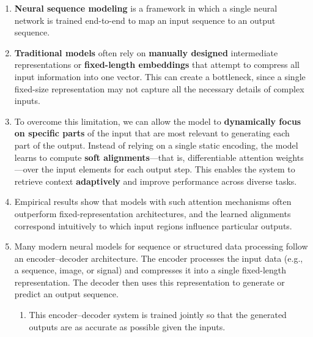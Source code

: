 \begin{enumerate}
    \item \textbf{Neural sequence modeling} is a framework in which a single neural network is trained end-to-end to map an input sequence to an output sequence. 
    \hfill \cite{arxiv/1409.0473/NMT-Jointly-Learning-Align-Translate, common/online/chatgpt}

    \item \textbf{Traditional models} often rely on \textbf{manually designed} intermediate representations or \textbf{fixed-length embeddings} that attempt to compress all input information into one vector. 
    This can create a bottleneck, since a single fixed-size representation may not capture all the necessary details of complex inputs. 
    \hfill \cite{arxiv/1409.0473/NMT-Jointly-Learning-Align-Translate, common/online/chatgpt}

    \item To overcome this limitation, we can allow the model to \textbf{dynamically focus on specific parts} of the input that are most relevant to generating each part of the output. 
    Instead of relying on a single static encoding, the model learns to compute \textbf{soft alignments}—that is, differentiable attention weights—over the input elements for each output step. 
    This enables the system to retrieve context \textbf{adaptively} and improve performance across diverse tasks.
    \hfill \cite{arxiv/1409.0473/NMT-Jointly-Learning-Align-Translate, common/online/chatgpt}

    \item Empirical results show that models with such attention mechanisms often outperform fixed-representation architectures, and the learned alignments correspond intuitively to which input regions influence particular outputs.
    \hfill \cite{arxiv/1409.0473/NMT-Jointly-Learning-Align-Translate, common/online/chatgpt}

    \item Many modern neural models for sequence or structured data processing follow an encoder–decoder architecture.
    The encoder processes the input data (e.g., a sequence, image, or signal) and compresses it into a single fixed-length representation. The decoder then uses this representation to generate or predict an output sequence.
    \hfill \cite{arxiv/1409.0473/NMT-Jointly-Learning-Align-Translate, common/online/chatgpt}
    \begin{enumerate}
        \item This encoder–decoder system is trained jointly so that the generated outputs are as accurate as possible given the inputs. 
        \hfill \cite{arxiv/1409.0473/NMT-Jointly-Learning-Align-Translate, common/online/chatgpt}
        

\end{enumerate}
\end{enumerate}
